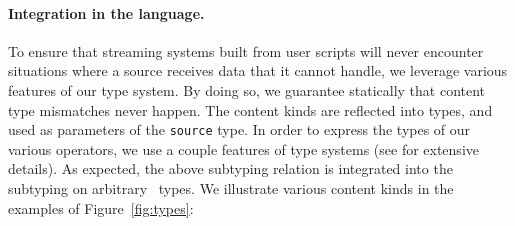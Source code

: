 \paragraph{Integration in the language.}
To ensure that streaming systems built from user scripts will never
encounter situations where a source receives data that it cannot handle,
we leverage various features of our type system.
By doing so, we guarantee statically that content type mismatches never happen.
The content kinds are reflected into types,
and used as parameters of the \texttt{source} type.
In order to express the types of our various operators,
we use a couple features of type systems
(see \cite{pierce02book} for extensive details).
As expected, the above subtyping relation is integrated into
the subtyping on arbitrary \liquidsoap\ types.
We illustrate various content kinds in the examples of Figure~\ref{fig:types}:
